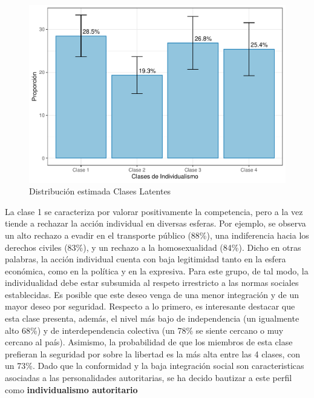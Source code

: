 \documentclass[12pt,twoside]{templates/facsothesis}
\begin{document}
\begin{figure}[!ht]

{\centering \includegraphics[width=1\linewidth,]{tesis_files/figure-latex/unnamed-chunk-13-1} 

}

\caption{Distribución estimada Clases Latentes}\label{fig:unnamed-chunk-13}
\end{figure}
\FloatBarrier

La clase 1 se caracteriza por valorar positivamente la competencia, pero a la vez tiende a rechazar la acción individual en diversas esferas. Por ejemplo, se observa un alto rechazo a evadir en el transporte público (88\%), una indiferencia hacia los derechos civiles (83\%), y un rechazo a la homosexualidad (84\%). Dicho en otras palabras, la acción individual cuenta con baja legitimidad tanto en la esfera económica, como en la política y en la expresiva. Para este grupo, de tal modo, la individualidad debe estar subsumida al respeto irrestricto a las normas sociales establecidas. Es posible que este deseo venga de una menor integración y de un mayor deseo por seguridad. Respecto a lo primero, es interesante destacar que esta clase presenta, además, el nivel más bajo de independencia (un igualmente alto 68\%) y de interdependencia colectiva (un 78\% se siente cercano o muy cercano al país). Asimismo, la probabilidad de que los miembros de esta clase prefieran la seguridad por sobre la libertad es la más alta entre las 4 clases, con un 73\%. Dado que la conformidad \citep{zakrisson2005} y la baja integración social \citep{gidron2020} son caracteristicas asociadas a las personalidades autoritarias, se ha decido bautizar a este perfil como \textbf{individualismo autoritario}
\end{document}
